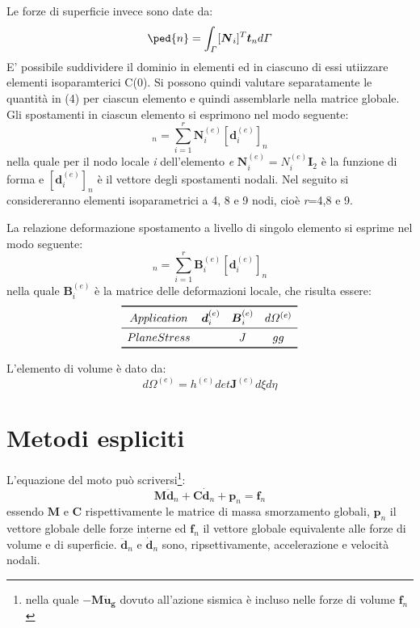 Le forze di superficie invece sono date da:
\begin{equation}
	[\boldsymbol{f}\ped{Ti}]\ped{n} = \int_\varGamma[\boldsymbol{N}_i]^T \boldsymbol{t}_n d\varGamma
\end{equation}
E' possibile suddividere il dominio in elementi ed in ciascuno di essi utiizzare elementi isoparamterici C(0). Si possono quindi valutare separatamente le quantità in (4) per ciascun elemento e quindi assemblarle nella matrice globale. Gli spostamenti in ciascun elemento si esprimono nel modo seguente:
\begin{equation}
	[u^{(e)}]_n= \sum_{i=1}^{r}\boldsymbol{N}_i^{(e)}[\boldsymbol{d}_i^{(e)}]_n
\end{equation}
nella quale per il nodo locale \textit{i} dell'elemento \textit{e} $\boldsymbol{N}_i^{(e)}=N_i^{(e)}\boldsymbol{I}_2$ è la funzione di forma e $[\boldsymbol{d}_i^{(e)}]_n$ è il vettore degli spostamenti nodali. Nel seguito si considereranno elementi isoparametrici a 4, 8 e 9 nodi, cioè \textit{r}=4,8 e 9.

La relazione deformazione spostamento a livello di singolo elemento si esprime nel modo seguente:
\begin{equation}
	[\boldsymbol{\epsilon}^{(e)}]_n = \sum_{i=1}^r \boldsymbol{B}_i^{(e)}[\boldsymbol{d}_i^{(e)}]_n
\end{equation}
nella quale $\boldsymbol{B}_i^{(e)}$ è la matrice delle deformazioni locale, che risulta essere:
\[
\begin{array}{cccc}
	\toprule
	Application   & \boldsymbol{d}_i^{(e)}     & \boldsymbol{B}_i^{(e)} & d\varOmega^{(e)} \\
	\midrule
	Plane Stress  &   & J                      &        gg        \\
	\bottomrule
\end{array}
\]

L'elemento di volume è dato da:
\begin{equation}
	d \Omega^{(e)} = h^{(e)} det \mathbf{J}^{(e)} d \xi d \eta
\end{equation}


\section{Metodi espliciti}
L'equazione del moto può scriversi\footnote{nella quale $-\boldsymbol{M \ddot{u}_g}$ dovuto all'azione sismica è incluso nelle forze di volume $\boldsymbol{f}_n$}:
\begin{equation}
	\boldsymbol {M\ddot d}_n + \boldsymbol C \boldsymbol{\dot d}_n + \boldsymbol{p}_n = \boldsymbol{f}_n
	\label{eq:moto}
\end{equation}
essendo $\boldsymbol{M}$ e $\boldsymbol{C}$ rispettivamente le matrice di massa smorzamento globali,  $\boldsymbol{p}_n$ il vettore globale delle forze interne ed $\boldsymbol{f}_n$ il vettore globale equivalente alle forze di volume e di superficie. $\boldsymbol{\ddot d}_n$ e $\boldsymbol{\dot d}_n$ sono, ripsettivamente, accelerazione e velocità nodali.

